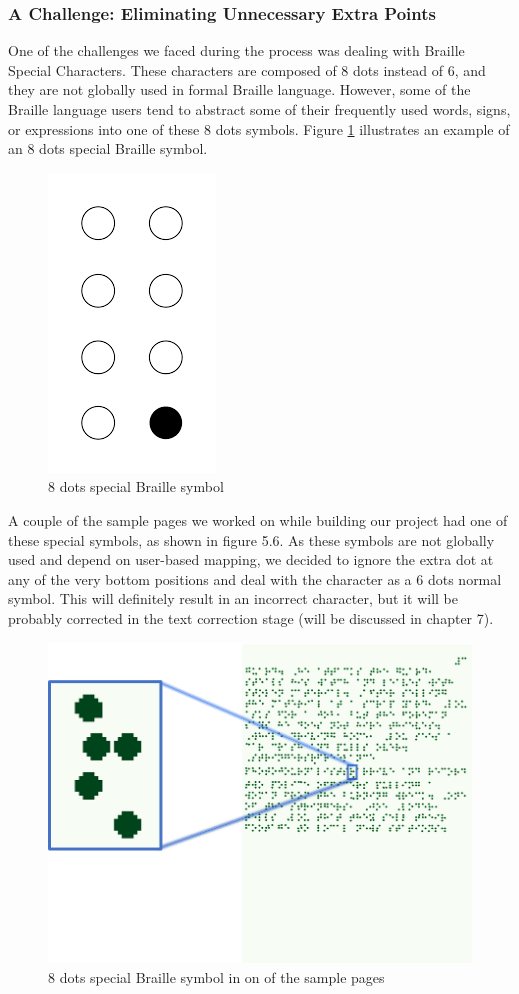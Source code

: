 \subsubsection{A Challenge: Eliminating Unnecessary Extra Points}

One of the challenges we faced during the process was dealing with Braille Special Characters. These characters are composed of 8 dots instead of 6, and they are not globally used in formal Braille language. However, some of the Braille language users tend to abstract some of their frequently used words, signs, or expressions into one of these 8 dots symbols. Figure \ref{fig:num7} illustrates an example of an 8 dots special Braille symbol.

\begin{figure}[H]
    \centering
    \includegraphics[width=0.25\linewidth]{Hough/8dots.png}
    \caption{8 dots special Braille symbol}
    \label{fig:num7}
\end{figure}

A couple of the sample pages we worked on while building our project had one of these special symbols, as shown in figure 5.6. As these symbols are not globally used and depend on user-based mapping, we decided to ignore the extra dot at any of the very bottom positions and deal with the character as a 6 dots normal symbol. This will definitely result in an incorrect character, but it will be probably corrected in the text correction stage (will be discussed in chapter 7).

\begin{figure}[H]
    \centering
    \includegraphics[width=0.85\linewidth]{Hough/Extra dot.png}
    \caption{8 dots special Braille symbol in on of the sample pages}
    \label{fig:num8}
\end{figure}


